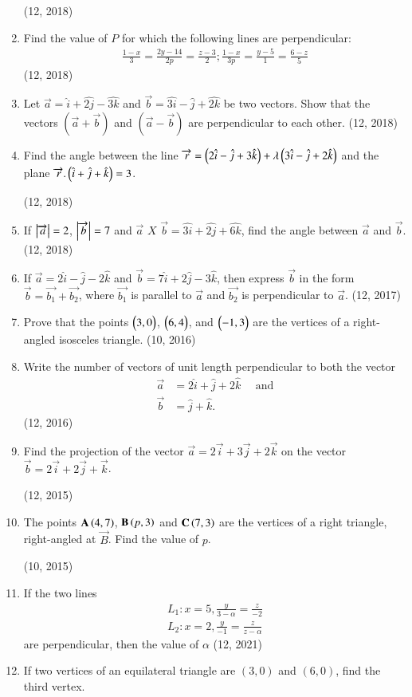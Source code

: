 \begin{enumerate}[label=\thesubsection.\arabic*, ref=\thesubsection.\theenumi]
\hfill (12, 2018)
\item Find the value of $P$ for which the following lines are perpendicular:
 \begin{align*}
 \frac{1-x}{3}=\frac{2y-14}{2p}=\frac{z-3}{2}; \frac{1-x}{3p}=\frac{y-5}{1}=\frac{6-z}{5}
 \end{align*}
 \hfill (12, 2018)
\item Let $\vec{a}=\hat{i}+\hat{2j}-\hat{3k}$ and $\vec{b}=\hat{3i}-\hat{j}+\hat{2k}$ be two vectors. Show that the vectors $(\vec{a}+\vec{b})$ and $(\vec{a}-\vec{b})$ are perpendicular to each other.
\hfill (12, 2018)
\item Find the angle between the line $\overrightarrow{r}=\left(2\hat{i}-\hat{j}+3\hat{k}\right)+\lambda\left(3\hat{i}-\hat{j}+2\hat{k}\right)$ and the plane $\overrightarrow{r}.\left(\hat{i}+\hat{j}+\hat{k}\right)=3$.

\hfill (12, 2018) 
\item If $\left\vert\overrightarrow{a}\right\vert=2$, $\left\vert\overrightarrow{b}\right\vert=7$ and  $\overrightarrow{a}$ $X$ $\overrightarrow{b} =\hat{3i}+\hat{2j}+\hat{6k}$, find the angle between $\overrightarrow{a}$ and $\overrightarrow{b}$.
\hfill (12, 2018) 
    \item If $\vec{a} = 2\hat{i} - \hat{j} - 2\hat{k}$ and $\vec{b} = 7\hat{i} + 2\hat{j} - 3\hat{k}$, then express $\vec{b}$ in the form $\vec{b} = \vec{b_1} + \vec{b_2}$, where $\vec{b_1}$ is parallel to $\vec{a}$ and $\vec{b_2}$ is perpendicular to $\vec{a}$. \hfill (12, 2017)
    \item Prove that the points $\begin{pmatrix}3,0\end{pmatrix}$, $\begin{pmatrix}6,4\end{pmatrix}$, and $\begin{pmatrix}-1,3\end{pmatrix}$ are the vertices of a right-angled isosceles triangle. \hfill (10, 2016)
\item Write the number of vectors of unit length perpendicular to both the vector
      \begin{align*}
          \vec{a} & = 2 \hat{i} + \hat{j} +2\hat{k} \quad\text{ and} \\
          \vec{b} & = \hat{j}+\hat{k}.
      \end{align*} \hfill (12, 2016)
\item Find the projection of the vector $\vec{a}=2\vec{i}+3\vec{j}+2\vec{k}$ on the vector $\vec{b}=2\vec{i}+2\vec{j}+\vec{k}$.

	\hfill (12, 2015)
\item The points $\mathbf{A}\left(4, 7\right)$, $\mathbf{B}\left(p, 3\right)$ and $\mathbf{C}\left(7, 3\right)$ are the vertices of a right triangle, right-angled at $\vec{B}$. Find the value of $p$.

	\hfill (10, 2015)
\item If the two lines
\begin{align*}
      L_1 : x=5,\frac{y}{3-\alpha}=\frac{z}{-2}\\
     L_2 : x=2,\frac{y}{-1}=\frac{z}{z-\alpha} 
   \end{align*}
are perpendicular, then the value of $\alpha$ 
\hfill (12, 2021)
    \item If two vertices of an equilateral triangle are $(3,0)$ and $(6,0)$, find the third vertex.   


\end{enumerate}
